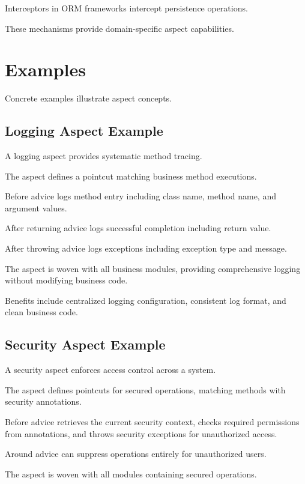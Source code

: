 \documentclass[11pt]{article}
\begin{document}
Interceptors in ORM frameworks intercept persistence operations.

These mechanisms provide domain-specific aspect capabilities.

\section{Examples}

Concrete examples illustrate aspect concepts.

\subsection{Logging Aspect Example}

A logging aspect provides systematic method tracing.

The aspect defines a pointcut matching business method executions.

Before advice logs method entry including class name, method name, and argument values.

After returning advice logs successful completion including return value.

After throwing advice logs exceptions including exception type and message.

The aspect is woven with all business modules, providing comprehensive logging without modifying business code.

Benefits include centralized logging configuration, consistent log format, and clean business code.

\subsection{Security Aspect Example}

A security aspect enforces access control across a system.

The aspect defines pointcuts for secured operations, matching methods with security annotations.

Before advice retrieves the current security context, checks required permissions from annotations, and throws security exceptions for unauthorized access.

Around advice can suppress operations entirely for unauthorized users.

The aspect is woven with all modules containing secured operations.
\end{document}
